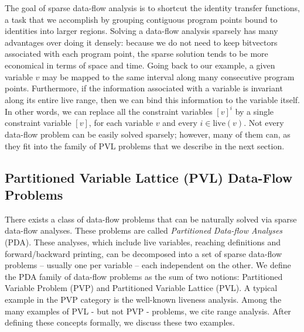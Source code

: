 The goal of sparse data-flow analysis is to shortcut the identity transfer functions, a task that we accomplish by grouping contiguous program points bound to identities into larger regions.
Solving a data-flow analysis sparsely has many advantages over doing it densely: because we do not need to keep bitvectors associated with each program point, the sparse solution tends to be more economical in terms of space and time.
Going back to our example, a given variable $v$ may be mapped to the same interval along many consecutive program points.
Furthermore, if the information associated with a variable is invariant along its
entire live range, then we can bind this information to the variable itself.
In other words, we can replace all the constraint variables
$[v]^i$ by a single constraint variable $[v]$, for each variable $v$
and every $i\in \textrm{live}(v)$.
Not every data-flow problem can be easily solved sparsely; however, many of them can, as they fit into the family of PVL problems that we describe in the next section.

\subsection{Partitioned Variable Lattice (PVL) Data-Flow Problems}
\label{sec:ssi:pereira:pvpPvl}

There exists a class of data-flow problems that can be naturally solved via sparse data-flow analyses.
These problems are called {\em Partitioned Data-flow Analyses} (PDA).
These analyses, which include live variables, reaching definitions and forward/backward printing, can be decomposed into a set of sparse data-flow problems -- usually one per variable -- each independent on the other.
We define the PDA family of data-flow problems as the sum of two notions: Partitioned Variable Problem (PVP) and Partitioned Variable Lattice (PVL).
A typical example in the PVP category is the well-known liveness analysis.
Among the many examples of PVL - but not PVP - problems, we cite range analysis.
After defining these concepts formally, we discuss these two examples.


